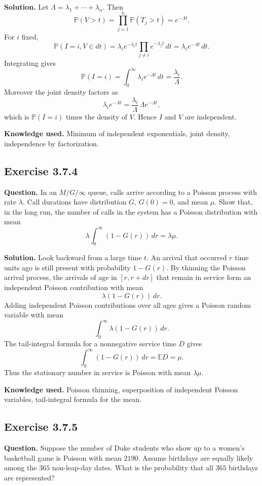 \documentclass[11pt]{article}
\newcommand{\Prob}{\mathbb{P}}
\newcommand{\E}{\mathbb{E}}
\begin{document}
\textbf{Solution.}
Let $\Lambda=\lambda_1+\cdots+\lambda_n$.  Then
\[
  \Prob(V>t)
  =
  \prod_{j=1}^n \Prob(T_j>t)
  =
  e^{-\Lambda t}.
\]
For $i$ fixed,
\[
  \Prob(I=i,V\in dt)
  =
  \lambda_i e^{-\lambda_i t}\prod_{j\ne i}e^{-\lambda_j t}\,dt
  =
  \lambda_i e^{-\Lambda t}\,dt.
\]
Integrating gives
\[
  \Prob(I=i)=\int_0^\infty \lambda_i e^{-\Lambda t}\,dt
  =
  \frac{\lambda_i}{\Lambda}.
\]
Moreover the joint density factors as
\[
  \lambda_i e^{-\Lambda t}
  =
  \frac{\lambda_i}{\Lambda}\,\Lambda e^{-\Lambda t},
\]
which is $\Prob(I=i)$ times the density of $V$.  Hence $I$ and $V$ are
independent.

\textbf{Knowledge used.}
Minimum of independent exponentials, joint density, independence by
factorization.

\subsection*{Exercise 3.7.4}
\textbf{Question.}
In an $M/G/\infty$ queue, calls arrive according to a Poisson process with
rate $\lambda$.  Call durations have distribution $G$, $G(0)=0$, and mean
$\mu$.  Show that, in the long run, the number of calls in the system has
a Poisson distribution with mean
\[
  \lambda\int_0^\infty (1-G(r))\,dr=\lambda\mu.
\]

\textbf{Solution.}
Look backward from a large time $t$.  An arrival that occurred $r$ time
units ago is still present with probability $1-G(r)$.  By thinning the
Poisson arrival process, the arrivals of age in $[r,r+dr]$ that remain in
service form an independent Poisson contribution with mean
\[
  \lambda (1-G(r))\,dr.
\]
Adding independent Poisson contributions over all ages gives a Poisson
random variable with mean
\[
  \int_0^\infty \lambda(1-G(r))\,dr.
\]
The tail-integral formula for a nonnegative service time $D$ gives
\[
  \int_0^\infty (1-G(r))\,dr=\E D=\mu.
\]
Thus the stationary number in service is Poisson with mean
$\lambda\mu$.

\textbf{Knowledge used.}
Poisson thinning, superposition of independent Poisson variables,
tail-integral formula for the mean.

\subsection*{Exercise 3.7.5}
\textbf{Question.}
Suppose the number of Duke students who show up to a women's basketball
game is Poisson with mean $2190$.  Assume birthdays are equally likely
among the $365$ non-leap-day dates.  What is the probability that all
$365$ birthdays are represented?
\end{document}
